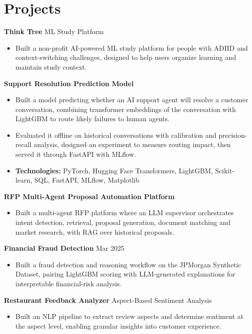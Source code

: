 \documentclass[10pt,a4paper]{article}
\begin{document}
\section{Projects}
\textbf{Think Tree} \textbar{} ML Study Platform\par
\begin{itemize}
  \item Built a non-profit AI-powered ML study platform for people with ADHD and context-switching challenges, designed to help users organize learning and maintain study context.
\end{itemize}
\textbf{Support Resolution Prediction Model}\par
\begin{itemize}
  \item Built a model predicting whether an AI support agent will resolve a customer conversation, combining transformer embeddings of the conversation with LightGBM to route likely failures to human agents.
  \item Evaluated it offline on historical conversations with calibration and precision-recall analysis, designed an experiment to measure routing impact, then served it through FastAPI with MLflow.
  \item \textbf{Technologies:} PyTorch, Hugging Face Transformers, LightGBM, Scikit-learn, SQL, FastAPI, MLflow, Matplotlib
\end{itemize}
\textbf{RFP Multi-Agent Proposal Automation Platform}\par
\begin{itemize}
  \item Built a multi-agent RFP platform where an LLM supervisor orchestrates intent detection, retrieval, proposal generation, document matching and market research, with RAG over historical proposals.
\end{itemize}
\textbf{Financial Fraud Detection} \textbar{} Mar 2025\par
\begin{itemize}
  \item Built a fraud detection and reasoning workflow on the JPMorgan Synthetic Dataset, pairing LightGBM scoring with LLM-generated explanations for interpretable financial-risk analysis.
\end{itemize}
\textbf{Restaurant Feedback Analyzer} \textbar{} Aspect-Based Sentiment Analysis\par
\begin{itemize}
  \item Built an NLP pipeline to extract review aspects and determine sentiment at the aspect level, enabling granular insights into customer experience.
\end{itemize}
\end{document}
